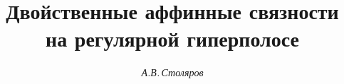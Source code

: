 

 







\newcommand{\pn}{{\phantom{n}}}


\newcommand{\pj}{{\phantom{j}}}


\newcommand{\up}[2]{\overset{#1}{#2}{}} 


\newcommand{\en}{\text{--}} 


\newcommand{\tts}[1]{} 


\renewcommand{\baselinestretch}{0.96}


 




 


\setcounter{page}{55} 












\author{\it А.В.\,Столяров} 




\title{Двойственные аффинные связности\\ 


на регулярной гиперполосе} 


 


\date{} 




\pagestyle{plain} %


 




